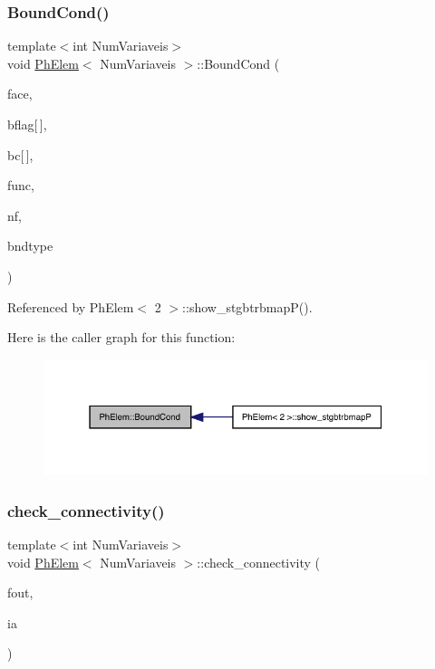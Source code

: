 \subsubsection{\texorpdfstring{Bound\+Cond()}{BoundCond()}}
{\footnotesize\ttfamily template$<$int Num\+Variaveis$>$ \\
void \hyperlink{classPhElem}{Ph\+Elem}$<$ Num\+Variaveis $>$\+::Bound\+Cond (\begin{DoxyParamCaption}\item[{const int \&}]{face,  }\item[{int}]{bflag\mbox{[}$\,$\mbox{]},  }\item[{double}]{bc\mbox{[}$\,$\mbox{]},  }\item[{double($\ast$)(double, double, double)}]{func,  }\item[{const int \&}]{nf,  }\item[{const int \&}]{bndtype }\end{DoxyParamCaption})}



Referenced by Ph\+Elem$<$ 2 $>$\+::show\+\_\+stgbtrbmap\+P().

Here is the caller graph for this function\+:
\nopagebreak
\begin{figure}[H]
\begin{center}
\leavevmode
\includegraphics[width=331pt]{classPhElem_a61311993fa273240a94044c599d52857_icgraph}
\end{center}
\end{figure}
\mbox{\label{classPhElem_a76ba4a82c7f21f9a83808315903692fe}} 
\subsubsection{\texorpdfstring{check\+\_\+connectivity()}{check\_connectivity()}}
{\footnotesize\ttfamily template$<$int Num\+Variaveis$>$ \\
void \hyperlink{classPhElem}{Ph\+Elem}$<$ Num\+Variaveis $>$\+::check\+\_\+connectivity (\begin{DoxyParamCaption}\item[{F\+I\+LE $\ast$}]{fout,  }\item[{const int \&}]{ia }\end{DoxyParamCaption})}



